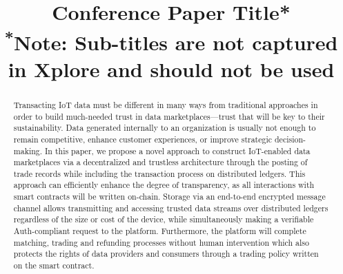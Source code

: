\documentclass[conference]{IEEEtran}
\begin{document}
\title{Conference Paper Title*\\
{\footnotesize \textsuperscript{*}Note: Sub-titles are not captured in Xplore and
should not be used}
}

\author{
\and
{}
\and
{}
}

\maketitle

\begin{abstract}
Transacting IoT data must be different in many ways from traditional approaches in order to build much-needed trust in data marketplaces—trust that will be key to their sustainability. Data generated internally to an organization is usually not enough to remain competitive, enhance customer experiences, or improve strategic decision-making. In this paper, we propose a novel approach to construct IoT-enabled data marketplaces via a decentralized and trustless architecture through the posting of trade records while including the transaction process on distributed ledgers. This approach can efficiently enhance the degree of transparency, as all interactions with smart contracts will be written on-chain. Storage via an end-to-end encrypted message channel allows transmitting and accessing trusted data streams over distributed ledgers regardless of the size or cost of the device, while simultaneously making a verifiable Auth-compliant request to the platform. Furthermore, the platform will complete matching, trading and refunding processes without human intervention which also protects the rights of data providers and consumers through a trading policy written on the smart contract.
\end{abstract}
\end{document}
